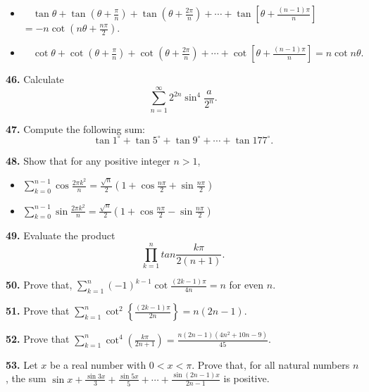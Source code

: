 \documentclass{article}
\begin{document}
\begin{itemize}


\item $ \quad \tan\theta+\tan\left(\theta+\frac{\pi}{n}\right)+\tan\left(\theta+\frac{2\pi}{n}\right)+\cdots +\tan\left[\theta+\frac{(n-1)\pi}{n}\right] $ $=-n\cot\left(n\theta+\frac{n\pi}{2}\right).$

\item $ \quad \cot\theta+\cot\left(\theta+\frac{\pi}{n}\right)+\cot\left(\theta+\frac{2\pi}{n}\right)+\cdots +\cot\left[\theta+\frac{(n-1)\pi}{n}\right]=n\cot n\theta.$

\end{itemize}

\noindent
{\bf 46.} Calculate
\[\sum_{n=1}^\infty 2^{2n}\sin^4 \frac{a}{2^n}.\]

\noindent
{\bf 47.} Compute the following sum:
\[\tan 1^\circ + \tan 5^\circ +\tan 9^\circ + \cdots +\tan 177^\circ.\]

\noindent
{\bf 48.} Show that for any positive integer $n>1$,

\begin{itemize}

\item $\displaystyle \sum_{k=0}^{n-1}\cos\frac{2\pi k^{2}}{n}=\frac{\sqrt{n}}{2}(1+\cos\frac{n\pi}{2}+\sin\frac{n\pi}{2})$

\item $\displaystyle \sum_{k=0}^{n-1}\sin\frac{2\pi k^{2}}{n}=\frac{\sqrt{n}}{2}(1+\cos\frac{n\pi}{2}-\sin\frac{n\pi}{2})$

\end{itemize}

\noindent
{\bf 49.} Evaluate the product
\[ \prod_{k=1}^{n}tan\frac{k\pi}{2(n+1)}.\]

\noindent
{\bf 50.} Prove that, $\displaystyle \sum_{k=1}^{n}(-1)^{k-1}\cot\frac{(2k-1)\pi}{4n}=n$ for even $n.$

\noindent
{\bf 51.} Prove that $\displaystyle \sum_{k=1}^{n}\cot^{2}\left\{\frac{(2k-1)\pi}{2n}\right\}=n(2n-1)$.

\noindent
{\bf 52.} Prove that $\displaystyle \sum_{k=1}^{n}\cot^{4}\left(\frac{k\pi}{2n+1}\right)=\frac{n(2n-1)(4n^{2}+10n-9)}{45}$.

\singlespacing
\noindent
{\bf 53.} Let $x$ be a real number with $0<x<\pi$. Prove that, for all natural numbers $n$, the sum $\sin x + \frac{\sin 3x}{3} + \frac{\sin 5x}{5}+\cdots+ \frac{\sin (2n-1)x}{2n-1}$ is positive.
\end{document}
